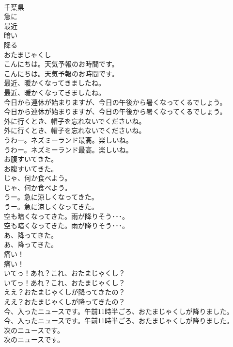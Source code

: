 \documentclass[8pt]{extreport}
\begin{document}
\begin{CJK}{UTF8}{min}
\\	千葉県
\\	急に
\\	最近
\\	暗い
\\	降る
\\	おたまじゃくし
\\	こんにちは。天気予報のお時間です。	
\\	こんにちは。天気予報のお時間です。 
\\	最近、暖かくなってきましたね。	
\\	最近、暖かくなってきましたね。 
\\	今日から連休が始まりますが、今日の午後から暑くなってくるでしょう。	
\\	今日から連休が始まりますが、今日の午後から暑くなってくるでしょう。 
\\	外に行くとき、帽子を忘れないでくださいね。	
\\	外に行くとき、帽子を忘れないでくださいね。 
\\	うわー。ネズミーランド最高。楽しいね。	
\\	うわー。ネズミーランド最高。楽しいね。 
\\	お腹すいてきた。	
\\	お腹すいてきた。 
\\	じゃ、何か食べよう。	
\\	じゃ、何か食べよう。 
\\	うー。急に涼しくなってきた。	
\\	うー。急に涼しくなってきた。 
\\	空も暗くなってきた。雨が降りそう･･･。	
\\	空も暗くなってきた。雨が降りそう･･･。 
\\	あ、降ってきた。	
\\	あ、降ってきた。 
\\	痛い！	
\\	痛い！ 
\\	いてっ！あれ？これ、おたまじゃくし？	
\\	いてっ！あれ？これ、おたまじゃくし？ 
\\	ええ？おたまじゃくしが降ってきたの？	
\\	ええ？おたまじゃくしが降ってきたの？ 
\\	今、入ったニュースです。午前11時半ごろ、おたまじゃくしが降りました。	
\\	今、入ったニュースです。午前11時半ごろ、おたまじゃくしが降りました。 
\\	次のニュースです。	
\\	次のニュースです。 

\end{CJK}
\end{document}
